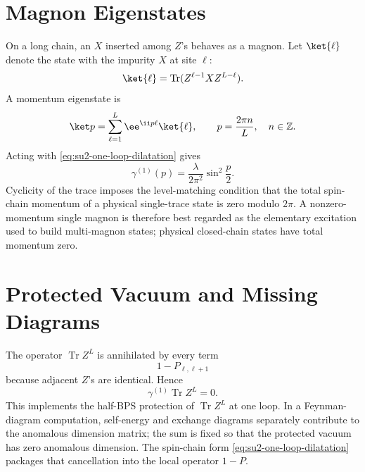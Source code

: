 \section{Magnon Eigenstates}

On a long chain, an \(X\) inserted among \(Z\)'s behaves as a magnon.  Let
\(\ket{\ell}\) denote the state with the impurity \(X\) at site \(\ell\):
\[
  \ket{\ell}
  =
  \operatorname{Tr}(Z^{\ell-1}XZ^{L-\ell}).
\]
A momentum eigenstate is
\begin{equation}
  \ket p
  =
  \sum_{\ell=1}^{L}
  \ee^{\ii p\ell}\ket{\ell},
  \qquad
  p=\frac{2\pi n}{L},
  \quad n\in\mathbb Z.
  \label{eq:single-magnon-momentum-state}
\end{equation}
Acting with \eqref{eq:su2-one-loop-dilatation} gives
\begin{equation}
  \gamma^{(1)}(p)
  =
  \frac{\lambda}{2\pi^2}
  \sin^2\frac p2.
  \label{eq:one-loop-magnon-dispersion}
\end{equation}
Cyclicity of the trace imposes the level-matching condition that the total
spin-chain momentum of a physical single-trace state is zero modulo
\(2\pi\).  A nonzero-momentum single magnon is therefore best regarded as the
elementary excitation used to build multi-magnon states; physical closed-chain
states have total momentum zero.

\section{Protected Vacuum and Missing Diagrams}

The operator \(\operatorname{Tr}Z^L\) is annihilated by every term
\[
  1-P_{\ell,\ell+1}
\]
because adjacent \(Z\)'s are identical.  Hence
\[
  \gamma^{(1)}\operatorname{Tr}Z^L=0.
\]
This implements the half-BPS protection of \(\operatorname{Tr}Z^L\) at one
loop.  In a Feynman-diagram computation, self-energy and exchange diagrams
separately contribute to the anomalous dimension matrix; the sum is fixed so
that the protected vacuum has zero anomalous dimension.  The spin-chain form
\eqref{eq:su2-one-loop-dilatation} packages that cancellation into the local
operator \(1-P\).

